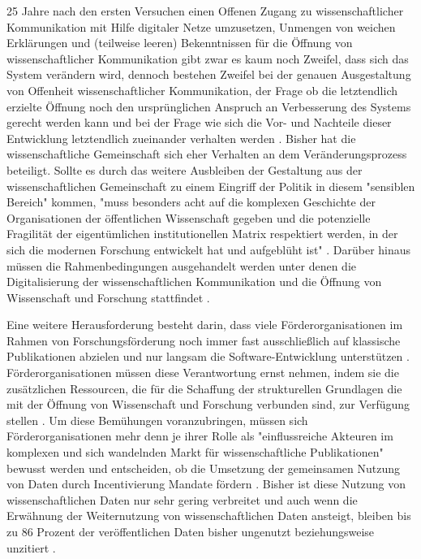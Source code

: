 25 Jahre nach den ersten Versuchen einen Offenen Zugang zu wissenschaftlicher Kommunikation mit Hilfe digitaler Netze umzusetzen, Unmengen von weichen Erklärungen und (teilweise leeren) Bekenntnissen für die Öffnung von wissenschaftlicher Kommunikation gibt zwar es kaum noch Zweifel, dass sich das System verändern wird, dennoch bestehen Zweifel bei der genauen Ausgestaltung von Offenheit wissenschaftlicher Kommunikation, der Frage ob die letztendlich erzielte Öffnung noch den ursprünglichen Anspruch an Verbesserung des Systems gerecht werden kann und bei der Frage wie sich die Vor- und Nachteile dieser Entwicklung letztendlich zueinander verhalten werden \cite{hagner_2015_sache_buches}. Bisher hat die wissenschaftliche Gemeinschaft sich eher Verhalten an dem Veränderungsprozess beteiligt. Sollte es durch das weitere Ausbleiben der Gestaltung aus der wissenschaftlichen Gemeinschaft zu einem Eingriff der Politik in diesem "sensiblen Bereich" kommen, "muss besonders acht auf die komplexen Geschichte der Organisationen der öffentlichen Wissenschaft gegeben und die potenzielle Fragilität der eigentümlichen institutionellen Matrix respektiert werden, in der sich die modernen Forschung entwickelt hat und aufgeblüht ist" \cite{david1998_common}. Darüber hinaus müssen die Rahmenbedingungen ausgehandelt werden unter denen die Digitalisierung der wissenschaftlichen Kommunikation und die Öffnung von Wissenschaft und Forschung stattfindet \cite{mennes_2013_making_os}.

Eine weitere Herausforderung besteht darin, dass viele Förderorganisationen im Rahmen von Forschungsförderung noch immer fast ausschließlich auf klassische Publikationen abzielen und nur langsam die Software-Entwicklung unterstützen \cite{hey_2015_open}. Förderorganisationen müssen diese Verantwortung ernst nehmen, indem sie die zusätzlichen Ressourcen, die für die Schaffung der strukturellen Grundlagen die mit der Öffnung von Wissenschaft und Forschung verbunden sind, zur Verfügung stellen \cite{mennes_2013_making_os} \cite{patlak_2010_open}. Um diese Bemühungen voranzubringen, müssen sich Förderorganisationen mehr denn je ihrer Rolle als "einflussreiche  Akteuren  im  komplexen und  sich  wandelnden  Markt  für  wissenschaftliche  Publikationen" \cite{wein_2010_erwerbung} bewusst werden und entscheiden, ob die Umsetzung der gemeinsamen Nutzung von Daten durch Incentivierung Mandate fördern \cite{mennes_2013_making_os}. Bisher ist diese Nutzung von wissenschaftlichen Daten nur sehr gering verbreitet und auch wenn die Erwähnung der Weiternutzung von wissenschaftlichen Daten ansteigt, bleiben bis zu 86 Prozent der veröffentlichen Daten bisher ungenutzt beziehungsweise unzitiert \cite{peters_2015_research}.

